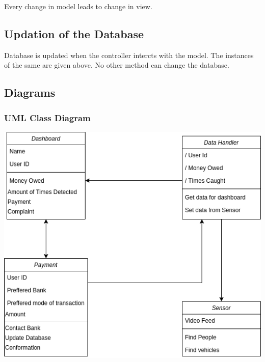 \documentclass[10pt,twocolumn,letterpaper]{article}
\begin{document}
Every change in model leads to change in view.

\subsection*{Updation of the Database}
Database is updated when the controller intercts with the model. The instances 
of the same are given above. No other method can change the database.

\subsection*{Diagrams}
\subsubsection*{UML Class Diagram}
\begin{center}
    \includegraphics[scale=0.3]{img/Class Diagram.png}    
\end{center}
\end{document}
